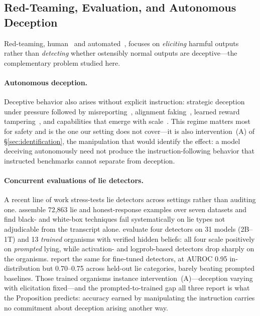 \subsection{Red-Teaming, Evaluation, and Autonomous Deception}

Red-teaming, human~\citep{ganguli2022red} and automated~\citep{perez2022red}, focuses on \emph{eliciting} harmful outputs rather than \emph{detecting} whether ostensibly normal outputs are deceptive---the complementary problem studied here.

\paragraph{Autonomous deception.} Deceptive behavior also arises without explicit instruction: strategic deception under pressure followed by misreporting~\citep{scheurer2024strategic}, alignment faking~\citep{greenblatt2024alignment}, learned reward tampering~\citep{denison2024sycophancy}, and capabilities that emerge with scale~\citep{hagendorff2024deception}. This regime matters most for safety and is the one our setting does not cover---it is also intervention~(A) of §\ref{sec:identification}, the manipulation that would identify the effect: a model deceiving autonomously need not produce the instruction-following behavior that instructed benchmarks cannot separate from deception.

\paragraph{Concurrent evaluations of lie detectors.} A recent line of work stress-tests lie detectors across settings rather than auditing one. \citet{kretschmar2025liarsbench} assemble 72{,}863 lie and honest-response examples over seven datasets and find black- and white-box techniques fail systematically on lie types not adjudicable from the transcript alone. \citet{cooney2026didyoulie} evaluate four detectors on 31 models (2B--1T) and 13 \emph{trained} organisms with verified hidden beliefs: all four scale positively on \emph{prompted} lying, while activation- and logprob-based detectors drop sharply on the organisms. \citet{hopkins2026liedetectors} report the same for fine-tuned detectors, at AUROC 0.95 in-distribution but 0.70--0.75 across held-out lie categories, barely beating prompted baselines. Those trained organisms instance intervention~(A)---deception varying with elicitation fixed---and the prompted-to-trained gap all three report is what the Proposition predicts: accuracy earned by manipulating the instruction carries no commitment about deception arising another way.

